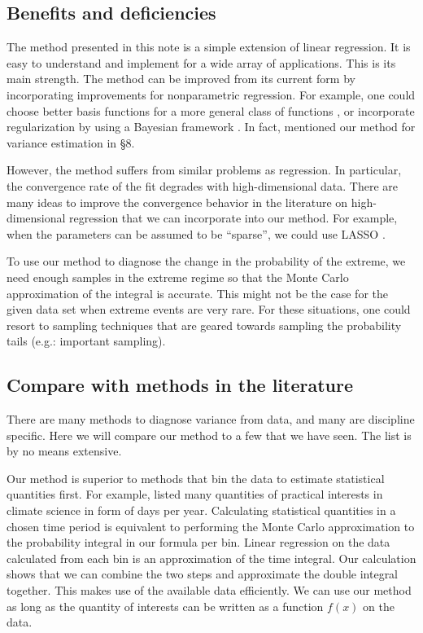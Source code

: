 \documentclass[11pt,letterpaper]{article}
\begin{document}
\subsection{Benefits and deficiencies}
The method presented in this note is a simple extension of linear regression. It is easy to understand and implement for a wide array of applications. This is its main strength. The method can be improved from its current form by incorporating improvements for nonparametric regression. For example, one could choose better basis functions for a more general class of functions \parencite{Tibshirani_18}, or incorporate regularization by using a Bayesian framework \parencite{Bishop_06}. In fact, \cite{Tibshirani_18} mentioned our method for variance estimation in \S8. 

However, the method suffers from similar problems as regression. In particular, the convergence rate of the fit degrades with high-dimensional data. There are many ideas to improve the convergence behavior in the literature on high-dimensional regression that we can incorporate into our method. For example, when the parameters can be assumed to be ``sparse'', we could use LASSO \parencite{Bishop_06}.

To use our method to diagnose the change in the probability of the extreme, we need enough samples in the extreme regime so that the Monte Carlo approximation of the integral is accurate. This might not be the case for the given data set when extreme events are very rare. For these situations, one could resort to sampling techniques that are geared towards sampling the probability tails (e.g.: important sampling).

\subsection{Compare with methods in the literature}
There are many methods to diagnose variance from data, and many are discipline specific. Here we will compare our method to a few that we have seen. The list is by no means extensive.

Our method is superior to methods that bin the data to estimate statistical quantities first. For example, \cite{TankKonnen_03} listed many quantities of practical interests in climate science in form of days per year. Calculating statistical quantities in a chosen time period is equivalent to performing the Monte Carlo approximation to the probability integral in our formula per bin. Linear regression on the data calculated from each bin is an approximation of the time integral. Our calculation shows that we can combine the two steps and approximate the double integral together. This makes use of the available data efficiently. We can use our method as long as the quantity of interests can be written as a function $f(x)$ on the data.
\end{document}
